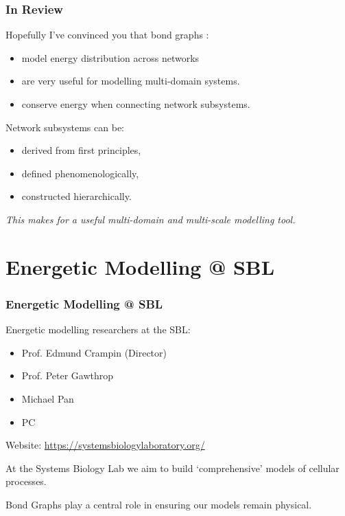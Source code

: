 \documentclass[12pt,reqno]{beamer}
\begin{document}
\begin{frame}
\frametitle{In Review}
Hopefully I've convinced you that bond graphs :
\begin{itemize}
	\item model energy distribution across networks
	\item are very useful for modelling multi-domain systems.
	\item conserve energy when connecting network subsystems.
\end{itemize}
\vspace{16pt}

Network subsystems can be:
\begin{itemize}
	\item derived from first principles,
	\item defined phenomenologically, 
	\item constructed hierarchically.
\end{itemize}
\begin{center}
\emph{This makes for a useful multi-domain and multi-scale modelling tool.}
\end{center}
\end{frame}
\section{Energetic Modelling @ SBL}
\begin{frame}
\frametitle{Energetic Modelling @ SBL}
Energetic modelling researchers at the SBL:
\begin{itemize}
	\item Prof. Edmund Crampin (Director)
	\item Prof. Peter Gawthrop
	\item Michael Pan
	\item PC
\end{itemize}
\begin{small}

Website: \url{https://systemsbiologylaboratory.org/}\\
	\vspace{10pt}
	
At the Systems Biology Lab we aim to build `comprehensive' models of cellular processes.\\
\vspace{10pt}

Bond Graphs play a central role in ensuring our models remain physical.
\end{small}
\end{frame}
\end{document}
